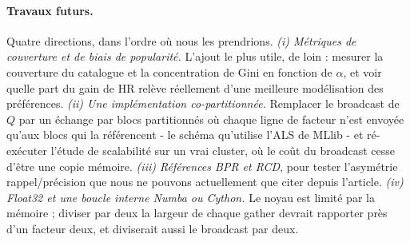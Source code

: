 \paragraph{Travaux futurs.} Quatre directions, dans l'ordre où nous les prendrions.
\emph{(i) Métriques de couverture et de biais de popularité.} L'ajout le plus utile,
de loin : mesurer la couverture du catalogue et la concentration de Gini en fonction
de $\alpha$, et voir quelle part du gain de HR relève réellement d'une meilleure
modélisation des préférences.
\emph{(ii) Une implémentation co-partitionnée.} Remplacer le broadcast de $Q$ par un
échange par blocs partitionnés où chaque ligne de facteur n'est envoyée qu'aux blocs
qui la référencent - le schéma qu'utilise l'ALS de MLlib - et ré-exécuter l'étude
de scalabilité sur un vrai cluster, où le coût du broadcast cesse d'être une copie
mémoire.
\emph{(iii) Références BPR et RCD}, pour tester l'asymétrie rappel/précision que nous
ne pouvons actuellement que citer depuis l'article.
\emph{(iv) Float32 et une boucle interne Numba ou Cython.} Le noyau est limité par la
mémoire ; diviser par deux la largeur de chaque gather devrait rapporter près d'un
facteur deux, et diviserait aussi le broadcast par deux.
